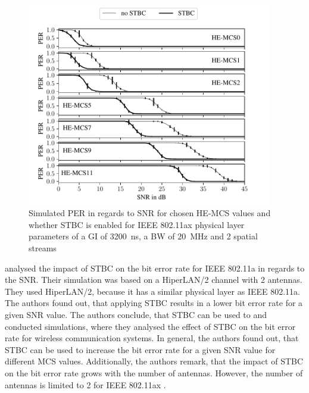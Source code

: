 \begin{figure}%
	\centering
	\includegraphics[width=0.95\textwidth]{figures/STBC_PER_to_SNR.pdf}
	\caption{Simulated \ac{PER} in regards to \ac{SNR} for chosen HE-\ac{MCS} values and whether \ac{STBC} is enabled for IEEE 802.11ax physical layer parameters of a \ac{GI} of \SI{3200}{\nano\second}, a \ac{BW} of \SI{20}{\mega\hertz} and 2 spatial streams}%
	\label{fig:PER_SNR_STBC}%
\end{figure}
\textcite{stamoulis_impact_2003} analysed the impact of \ac{STBC} on the bit error rate for IEEE 802.11a in regards to the \ac{SNR}. Their simulation was based
on a HiperLAN/2 channel with \num{2} antennas. They used HiperLAN/2, because it has a similar physical layer as IEEE 802.11a.
The authors found out, that applying \ac{STBC} results in a lower bit error rate for a given \ac{SNR} value. The authors conclude, that \ac{STBC} can be used to
\textcite{santumon_space-time_2012} and \textcite{tarokh_space-time_1999} conducted simulations, where they analysed the effect of \ac{STBC} on the bit error rate for
wireless communication systems. In general, the authors found out, that \ac{STBC} can be used to increase the bit error rate for a given \ac{SNR} value for different
\ac{MCS} values. Additionally, the authors remark, that the impact of \ac{STBC} on the bit error rate grows with the number of antennas.
However, the number of antennas is limited to \num{2} for IEEE 802.11ax \cite{noauthor_ieee_2021}.

